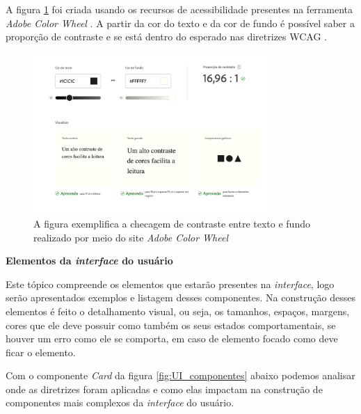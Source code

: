 {A figura \ref{fig3:tipografia} foi criada usando os recursos de acessibilidade presentes na ferramenta \textit{Adobe Color Wheel} \cite{ADOBE}. A partir da cor do texto e da cor de fundo é possível saber a proporção de contraste e se está dentro do esperado nas diretrizes WCAG \cite{WCAG20}.

\begin{figure}[ht]
    \centering
	\includegraphics[width=0.8\textwidth]{images/contrast_check.png}
    \caption{A figura exemplifica a checagem de contraste entre texto e fundo realizado por meio do site  \textit{Adobe Color Wheel} \cite{ADOBE}}
    \label{fig3:tipografia}
\end{figure} 

\newpage
{\centerline{\textbf{Elementos da \textit{interface} do usuário}}}
Este tópico compreende os elementos que estarão presentes na \textit{interface}, logo serão apresentados exemplos e listagem desses componentes. Na construção desses elementos é feito o detalhamento visual, ou seja, os tamanhos, espaços, margens, cores que ele deve possuir como também os seus estados comportamentais, se houver um erro como ele se comporta, em caso de elemento focado como deve ficar o elemento.

Com o componente \textit{Card} da figura \ref{fig:UI_componentes} abaixo podemos analisar onde as diretrizes foram aplicadas e como elas impactam na construção de componentes mais complexos da \textit{interface} do usuário.  

}
